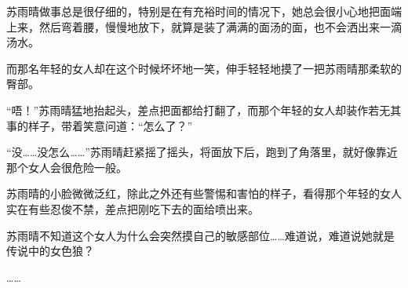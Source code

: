 苏雨晴做事总是很仔细的，特别是在有充裕时间的情况下，她总会很小心地把面端上来，然后弯着腰，慢慢地放下，就算是装了满满的面汤的面，也不会洒出来一滴汤水。

而那名年轻的女人却在这个时候坏坏地一笑，伸手轻轻地摸了一把苏雨晴那柔软的臀部。

“唔！”苏雨晴猛地抬起头，差点把面都给打翻了，而那个年轻的女人却装作若无其事的样子，带着笑意问道：“怎么了？”

“没……没怎么……”苏雨晴赶紧摇了摇头，将面放下后，跑到了角落里，就好像靠近那个女人会很危险一般。

苏雨晴的小脸微微泛红，除此之外还有些警惕和害怕的样子，看得那个年轻的女人实在有些忍俊不禁，差点把刚吃下去的面给喷出来。

苏雨晴不知道这个女人为什么会突然摸自己的敏感部位……难道说，难道说她就是传说中的女色狼？

……
